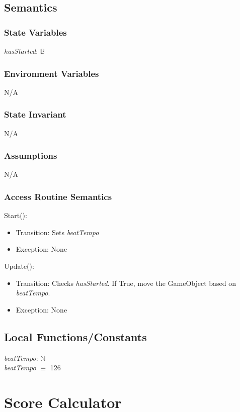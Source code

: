 \documentclass[12pt]{article}
\begin{document}
\subsection {Semantics}

\subsubsection {State Variables}
\textit{hasStarted}: $\mathbb{B}$ \\

\subsubsection {Environment Variables}
N/A

\subsubsection {State Invariant}
N/A

\subsubsection {Assumptions}
N/A

\subsubsection {Access Routine Semantics}
\noindent Start():
\begin{itemize}
    \item Transition: Sets \textit{beatTempo}
    \item Exception: None
\end{itemize}

\noindent Update():
\begin{itemize}
    \item Transition: Checks \textit{hasStarted}. If True, move the GameObject based on \textit{beatTempo}. 
    \item Exception: None
\end{itemize}


\subsection{Local Functions/Constants}
\textit{beatTempo}: $\mathbb{N} $ \\
\textit{beatTempo} $\equiv$ 126
\medskip


\newpage

\section{Score Calculator}
\end{document}
